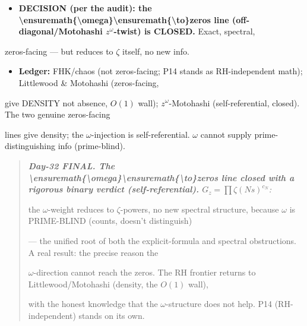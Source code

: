 \documentclass[10pt]{article}
\begin{document}
\begin{itemize}
\item \textbf{DECISION (per the audit): the \textbackslash{}ensuremath\{\textbackslash{}omega\}\textbackslash{}ensuremath\{\textbackslash{}to\}zeros line (off-diagonal/Motohashi $z^\omega$-twist) is CLOSED.} Exact, spectral,
\end{itemize}
  zeros-facing --- but reduces to \ensuremath{\zeta} itself, no new info.\par
\begin{itemize}
\item \textbf{Ledger:} FHK/chaos (not zeros-facing; P14 stands as RH-independent math); Littlewood \& Motohashi (zeros-facing,
\end{itemize}
  give DENSITY not absence, $O(1)$ wall); $z^\omega$-Motohashi (self-referential, closed). The two genuine zeros-facing\par
  lines give density; the \ensuremath{\omega}-injection is self-referential. \ensuremath{\omega} cannot supply prime-distinguishing info (prime-blind).\par

\begin{quote}\itshape
\textbf{Day-32 FINAL. The \textbackslash{}ensuremath\{\textbackslash{}omega\}\textbackslash{}ensuremath\{\textbackslash{}to\}zeros line closed with a rigorous binary verdict (self-referential).} $G_z=\prod\zeta(Ns)^{c_N}$:\par
the \ensuremath{\omega}-weight reduces to \ensuremath{\zeta}-powers, no new spectral structure, because \ensuremath{\omega} is PRIME-BLIND (counts, doesn't distinguish)\par
--- the unified root of both the explicit-formula and spectral obstructions. A real result: the precise reason the\par
\ensuremath{\omega}-direction cannot reach the zeros. The RH frontier returns to Littlewood/Motohashi (density, the $O(1)$ wall),\par
with the honest knowledge that the \ensuremath{\omega}-structure does not help. P14 (RH-independent) stands on its own.\par
\end{quote}
\end{document}
